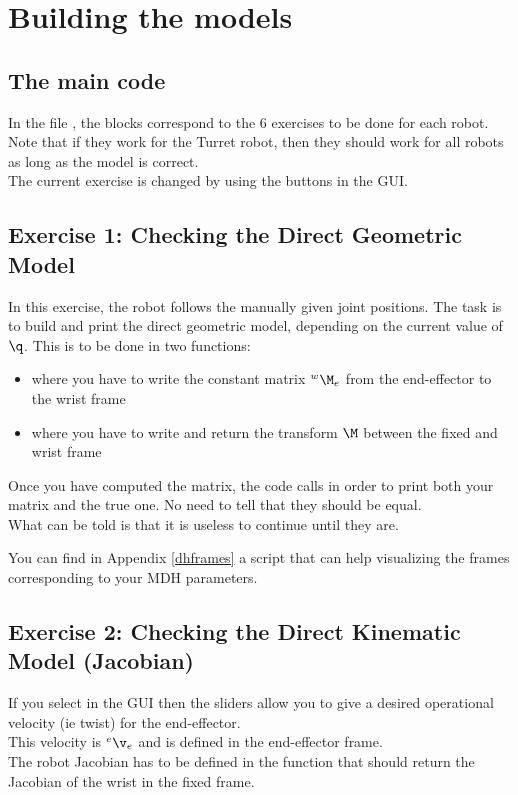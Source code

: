 \documentclass{ecnreport}
\begin{document}
  
  \section{Building the models}
  
  \subsection*{The main code}
  
  In the file , the  blocks correspond to the 6 exercises to be done for each robot. Note that if they work for the Turret robot, then
  they should work for all robots as long as the model is correct. \\
  The current exercise is changed by using the buttons in the GUI.
  
  \subsection*{Exercise 1: Checking the Direct Geometric Model}
  
  In this exercise, the robot follows the manually given joint positions. The task is to build and print the direct geometric model, depending on the current value of $\q$. This is to be done in two functions:
  \begin{itemize}
    \item {} where you have to write the constant matrix $\wMe$ from the end-effector to the wrist frame
    \item {}  where you have to write and return the transform $\M$ between the fixed and wrist frame
  \end{itemize}
  Once you have computed the  matrix, the code calls  in order to print both your matrix and the true one. No need to tell that they should be equal.\\
  What can be told is that it is useless to continue until they are.

  You can find in Appendix \ref{dhframes} a script that can help visualizing the frames corresponding to your MDH parameters.
  
  \subsection*{Exercise 2: Checking the Direct Kinematic Model (Jacobian)}
  
  If you select  in the GUI then the sliders allow you to give a desired operational velocity (ie twist) for the end-effector.\\
  This velocity is ${}^e\v_e$ and is defined in the end-effector frame.\\
  The robot Jacobian has to be defined in the function  that should return the Jacobian of the wrist in the fixed frame.\\
  
\end{document}
